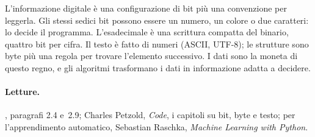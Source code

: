 L'informazione digitale è una configurazione di bit più una convenzione per
leggerla. Gli stessi sedici bit possono essere un numero, un colore o due
caratteri: lo decide il programma. L'esadecimale è una scrittura compatta del
binario, quattro bit per cifra. Il testo è fatto di numeri (ASCII, UTF-8); le
strutture sono byte più una regola per trovare l'elemento successivo. I dati
sono la moneta di questo regno, e gli algoritmi trasformano i dati in
informazione adatta a decidere.

\paragraph{Letture.} \citet{patterson2020}, paragrafi 2.4 e~2.9; Charles
Petzold, \emph{Code}, i capitoli su bit, byte e testo; per l'apprendimento
automatico, Sebastian Raschka, \emph{Machine Learning with Python}.